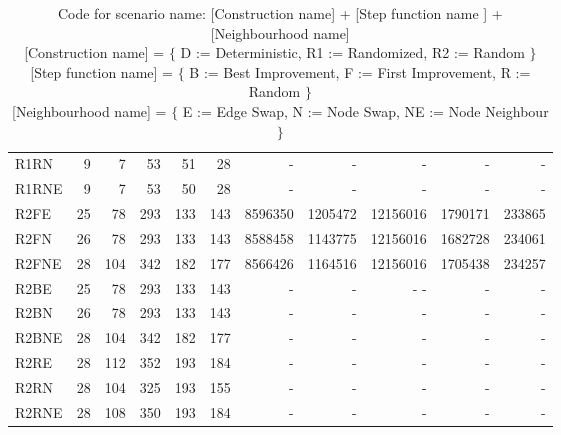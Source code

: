 \documentclass [11pt]{article}
\begin{document}
\begin{sidewaystable}
\begin{tabu} {| l |r | r |r |r |r |r |r |r |r |r |}
  R1RN    & 9  & 7   & 53   & 51 &  28  &  -   &   -    &   -    &    -   &   -    \\ 
  R1RNE    &9   &7    &53    &50  & 28   &  -   &   -    &   -    &    -   &   -    \\ 
  R2FE    & 25  &  78   & 293   & 133  &  143  &  8596350  &  1205472   & 12156016    &  1790171  & 233865   \\ 
  R2FN    & 26  &  78   & 293   & 133  &  143  &  8588458  &  1143775   & 12156016    &  1682728  & 234061   \\ 
  R2FNE    &28   &104    &342    &182   & 177   & 8566426   & 1164516    & 12156016    & 1705438   &234257    \\ 
  R2BE    & 25  &  78   & 293   & 133  &  143  &  -   &   -    &   -  -    &    -   &   -    \\ 
  R2BN    & 26  &  78   & 293   & 133  &  143  &  -   &   -    &   -    &    -   &   -    \\ 
  R2BNE    &28   &104    &342    &182   & 177   &  -   &   -    &   -    &    -   &   -    \\ 
  R2RE    & 28  & 112   & 352   & 193  &  184  &  -   &   -    &   -    &    -   &   -    \\ 
  R2RN    & 28  & 104   & 325   & 193  &  155  &  -   &   -    &   -    &    -   &   -    \\ 
  R2RNE    &28   &108    &350    &193   & 184   &  -   &   -    &   -    &    -   &   -    \\
\end{tabu}
\caption{ Code for scenario name: [Construction name] + [Step function name ]  + [Neighbourhood name] \\ 
          {[Construction name]} = $\{$  D := Deterministic, R1 := Randomized, R2 := Random $\}$  \\
          {[Step function name]} = $\{$  B := Best Improvement, F := First Improvement, R := Random $\}$ \\
          {[Neighbourhood name]} = $\{$  E := Edge Swap, N := Node Swap, NE := Node Neighbour $\}$ } 
\end{sidewaystable}
\end{document}
